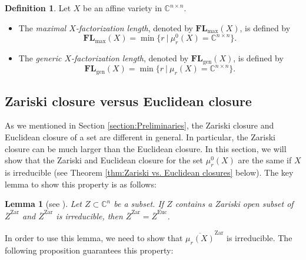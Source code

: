 \documentclass[reqno]{amsart}
\newtheorem{lemma}[theorem]{Lemma}
\theoremstyle{definition}
\newtheorem{definition}[theorem]{Definition}
\numberwithin{equation}{section}
\begin{document}
\begin{definition}
    Let $X$ be an affine variety in $\mathbb{C}^{n \times n}$.
    \begin{itemize}
        \item [(\romannumeral1)] The \emph{maximal $X$-factorization length}, denoted by $\mathbf{FL}_{\text{max}}(X)$, is defined by
    \begin{equation*}
        \mathbf{FL}_{\text{max}}(X)=\min\{r~|~\mu_r^0(X)=\mathbb{C}^{n \times n}\}.
    \end{equation*}
        \item [(\romannumeral2)] The \emph{generic $X$-factorization length}, denoted by $\mathbf{FL}_{\text{gen}}(X)$, is defined by
    \begin{equation*}
        \mathbf{FL}_{\text{gen}}(X)=\min\{r~|~\mu_r(X)=\mathbb{C}^{n \times n}\}.
    \end{equation*}
    \end{itemize}
    
\end{definition}

\subsection{Zariski closure versus Euclidean closure}\label{subsection:Zariski closure versus Euclidean closure}

As we mentioned in Section \ref{section:Preliminaries}, the Zariski closure and Euclidean closure of a set are different in general. In particular, the Zariski closure can be much larger than the Euclidean closure. In this section, we will show that the Zariski and Euclidean closure for the set $\mu_r^0(X)$ are the same if $X$ is irreducible (see Theorem \ref{thm:Zariski vs. Euclidean closures} below). The key lemma to show this property is as follows:

\begin{lemma}[see {\cite[Theorem 3.1.6.1]{landsberg2017geometry}}]\label{Lemma:Euclidean and Zariski closures}
    Let $Z \subset \mathbb{C}^n$ be a subset. If $Z$ contains a Zariski open subset of $\overline{Z}^{\text{Zar}}$ and $\overline{Z}^{\text{Zar}}$ is irreducible, then $\overline{Z}^{\text{Zar}}=\overline{Z}^{\text{Euc}}$.
\end{lemma}

In order to use this lemma, we need to show that $\overline{\mu_r(X)}^{\text{Zar}}$ is irreducible. The following proposition guarantees this property:
\end{document}
